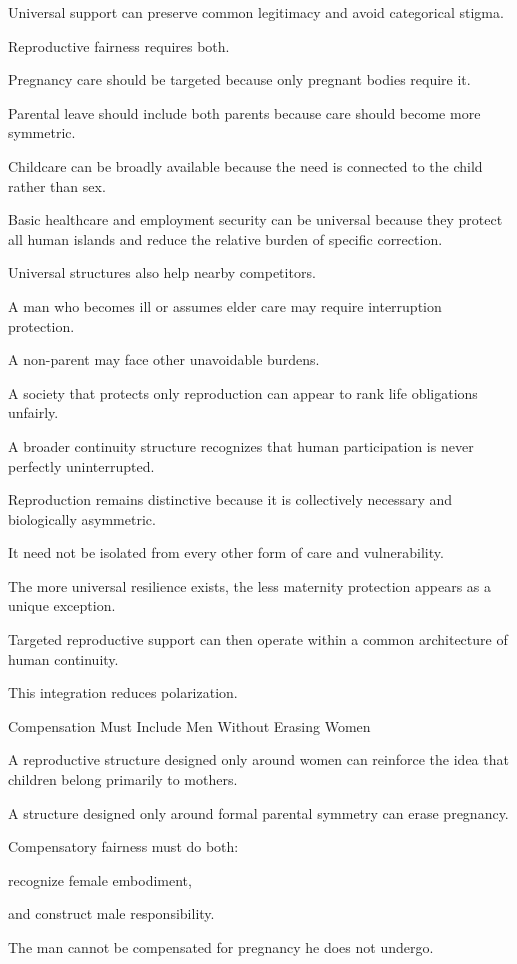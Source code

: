 Universal support can preserve common legitimacy and avoid categorical stigma.

Reproductive fairness requires both.

Pregnancy care should be targeted because only pregnant bodies require it.

Parental leave should include both parents because care should become more symmetric.

Childcare can be broadly available because the need is connected to the child rather than sex.

Basic healthcare and employment security can be universal because they protect all human islands and reduce the relative burden of specific correction.

Universal structures also help nearby competitors.

A man who becomes ill or assumes elder care may require interruption protection.

A non-parent may face other unavoidable burdens.

A society that protects only reproduction can appear to rank life obligations unfairly.

A broader continuity structure recognizes that human participation is never perfectly uninterrupted.

Reproduction remains distinctive because it is collectively necessary and biologically asymmetric.

It need not be isolated from every other form of care and vulnerability.

The more universal resilience exists, the less maternity protection appears as a unique exception.

Targeted reproductive support can then operate within a common architecture of human continuity.

This integration reduces polarization.

Compensation Must Include Men Without Erasing Women

A reproductive structure designed only around women can reinforce the idea that children belong primarily to mothers.

A structure designed only around formal parental symmetry can erase pregnancy.

Compensatory fairness must do both:

recognize female embodiment,

and construct male responsibility.

The man cannot be compensated for pregnancy he does not undergo.

